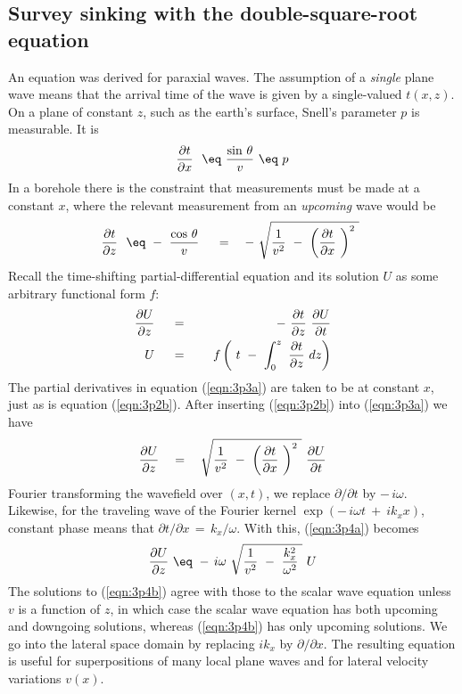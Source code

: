 \subsection{Survey sinking with the double-square-root equation}
\par
An equation was derived for paraxial waves.
The assumption of a
{\em  single}
plane wave means that the arrival time
of the wave is given by a single-valued  $t(x,z)$.
On a plane of constant  $z$, such as the earth's surface,
Snell's parameter  $p$  is measurable.
It is
\begin{equation}
{ \partial t   \over  \partial x } \  \  \eq \ 
{ \sin \, \theta   \over v }\  \eq \  p
\label{eqn:3p2a}
\end{equation}
In a borehole there is the constraint that measurements 
must be made
at a constant  $x$,  where the relevant measurement from an
{\em  upcoming}
wave would be
\begin{equation}
{ \partial t   \over  \partial z } \   \  \eq \ 
-\ { \cos \, \theta   \over v }\ \ \ \ = \quad
- \  \sqrt{ {1 \over  v^2 } \ -\ 
\left( {\partial t  \over \partial x} \  \right)^2 \ } \ 
\label{eqn:3p2b}
\end{equation}
Recall the time-shifting partial-differential equation and its
solution  $U$  as some arbitrary functional form  $f$:
\begin{eqnarray}
{ \partial U   \over  \partial z } \ \  \ \ &=&\ \ \ \  - \ 
{ \partial t   \over  \partial z } \ 
{ \partial U   \over  \partial t }
\label{eqn:3p3a}
\\
U \ \ \ \ &=&\ \ \ \ 
f \left( \ t \ -\  \int_0^z \  {\partial t  \over \partial z} \  dz \right)
\label{eqn:3p3b}
\end{eqnarray}
The partial derivatives
in equation (\ref{eqn:3p3a}) are taken to be at constant $x$,
just as is equation (\ref{eqn:3p2b}).
After inserting (\ref{eqn:3p2b}) into (\ref{eqn:3p3a}) we have
\begin{equation}
{ \partial U   \over  \partial z } \quad = \quad \sqrt{ {1 \over  v^2 } \ -\ 
\left( {\partial t  \over \partial x} \  \right)^2
 \ }\  { \partial U  
\over  \partial t }
\label{eqn:3p4a}
\end{equation}
Fourier transforming the wavefield over  $(x,t)$,   we
replace  $ \partial / \partial t $  by  $ -\,i \omega $.
Likewise, for the traveling wave
of the Fourier kernel  $ \exp (-\,i \omega t \ +\  ik_x x )$,
constant phase means that  ${\partial t}/{\partial x} \,=\, k_x / \omega $.
With this, (\ref{eqn:3p4a}) becomes
\begin{equation}
{ \partial U   \over  \partial z } \  \eq \  - \, i \omega  \  
\sqrt{
{1 \over  v^2 } \ -\  { k_x^2   \over \omega^2} \  } \  U
\label{eqn:3p4b}
\end{equation}
The solutions to (\ref{eqn:3p4b}) agree with those to the scalar wave equation
unless  $v$  is a function of  $z$,  in which case
the scalar wave equation has both upcoming and downgoing solutions,
whereas (\ref{eqn:3p4b}) has only upcoming solutions.
We
go into the lateral space
domain by replacing  $ i k_x $  by  $ \partial / \partial x $.
The resulting equation is useful for superpositions of many local plane waves
and for lateral velocity variations  $v(x)$.
